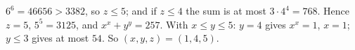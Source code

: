 $6^6=46656>3382$, so $z\le5$; and if $z\le4$ the sum is at most $3\cdot4^4=768$. Hence $z=5$, $5^5=3125$, and $x^x+y^y=257$. With $x\le y\le5$: $y=4$ gives $x^x=1$, $x=1$; $y\le3$ gives at most $54$. So $(x,y,z)=\boxed{(1,4,5)}$.
